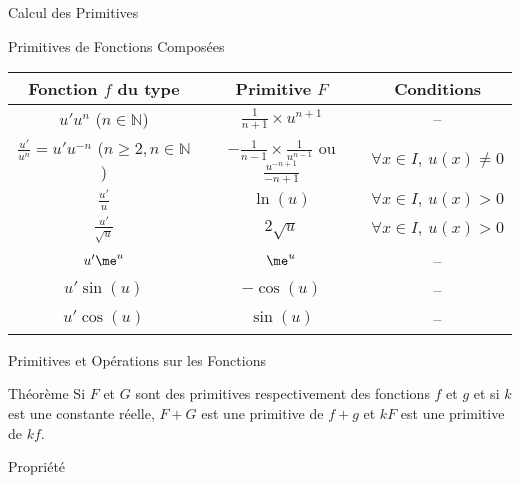 \documentclass{cours}
\begin{document}
\begin{Gpartie}{Calcul des Primitives}
\begin{Spartie}{Primitives de Fonctions Composées}
            \begin{center}\begin{tabular}[c]{ @{}*{3}{C}@{} } \toprule
                Fonction $f$ du type                                    & Primitive $F$                                                             & Conditions  \\ \midrule
                $u'u^n$ ($n\in\mathbb{N}$)                              & $\frac{1}{n+1}\times u^{n+1}$                                             & \---\\
                $\frac{u'}{u^n}=u'u^{-n}$ ($n\geq2, n\in\mathbb{N}$)   & $-\frac{1}{n-1}\times\frac{1}{u^{n-1}}$ ou $\frac{u^{-n+1}}{-n+1}$        & $\forall x\in I,\ u(x)\neq0$ \\
                $\frac{u'}{u}$                                          & $\ln(u)$                                                                  & $\forall x\in I,\ u(x)>0$ \\
                $\frac{u'}{\sqrt{u}}$                                   & $2\sqrt{u}$                                                               & $\forall x\in I,\ u(x)>0$ \\
                $u'\me^u$                                                 & $\me^u$                                                                     & \---\\
                $u'\sin(u)$                                             & $-\cos(u)$                                                                & \---\\
                $u'\cos(u)$                                             & $\sin(u)$                                                                 & \---\\ \bottomrule
            \end{tabular}\end{center}
            \parbox{\linewidth}{}
        \end{Spartie}
        \pagebreak
        \begin{Spartie}{Primitives et Opérations sur les Fonctions} 
            \begin{SSpartie}{Théorème} 
                Si $F$ et $G$ sont des primitives respectivement des fonctions $f$ et $g$ et si $k$ est une constante réelle, $F+G$ est une primitive de $f+g$ et $kF$ est une primitive de $kf$.
            \end{SSpartie}
            \begin{SSpartie}{Propriété} 

\end{SSpartie}
\end{Spartie}
\end{Gpartie}
\end{document}
